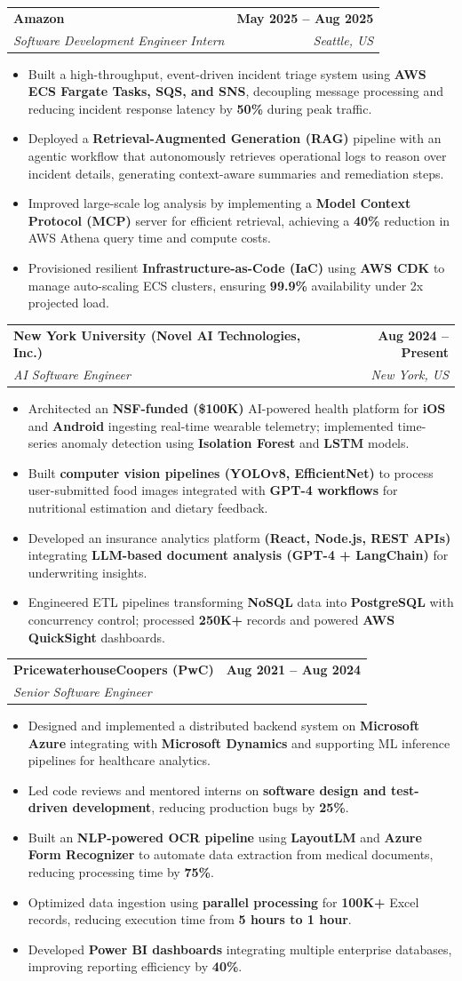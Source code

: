 \documentclass[letterpaper,10pt]{article}
\makeatletter
\newcommand{\resumeItem}[1]{
\item\small{{#1}\vspace{-3.5pt}}
}
\newcommand{\resumeSubheading}[4]{
\vspace{6pt}
\item
\begin{tabular*}{1.0\textwidth}[t]{l@{\extracolsep{\fill}}r}
\textbf{#1} & \textbf{\small #2} \\
\textit{\small#3} & \textit{\small #4} \\
\end{tabular*}\vspace{-5.5pt}
}
\newcommand{\resumeItemListStart}{\begin{itemize}[leftmargin=*, itemsep=0pt, topsep=0pt]}
\newcommand{\resumeItemListEnd}{\end{itemize}\vspace{-3pt}}
\makeatother
\begin{document}
\resumeSubheading
  {Amazon}{May 2025 -- Aug 2025}
  {Software Development Engineer Intern}{Seattle, US}
\resumeItemListStart
  \resumeItem{Built a high-throughput, event-driven incident triage system using \textbf{AWS ECS Fargate Tasks, SQS, and SNS}, decoupling message processing and reducing incident response latency by \textbf{50\%} during peak traffic.}
  \resumeItem{Deployed a \textbf{Retrieval-Augmented Generation (RAG)} pipeline with an agentic workflow that autonomously retrieves operational logs to reason over incident details, generating context-aware summaries and remediation steps.}
  \resumeItem{Improved large-scale log analysis by implementing a \textbf{Model Context Protocol (MCP)} server for efficient retrieval, achieving a \textbf{40\%} reduction in AWS Athena query time and compute costs.}
  \resumeItem{Provisioned resilient \textbf{Infrastructure-as-Code (IaC)} using \textbf{AWS CDK} to manage auto-scaling ECS clusters, ensuring \textbf{99.9\%} availability under 2x projected load.}
\resumeItemListEnd

\resumeSubheading
  {New York University (Novel AI Technologies, Inc.)}{Aug 2024 -- Present}
  {AI Software Engineer}{New York, US}
\resumeItemListStart
  \resumeItem{Architected an \textbf{NSF-funded (\$100K)} AI-powered health platform for \textbf{iOS} and \textbf{Android} ingesting real-time wearable telemetry; implemented time-series anomaly detection using \textbf{Isolation Forest} and \textbf{LSTM} models.}
  \resumeItem{Built \textbf{computer vision pipelines (YOLOv8, EfficientNet)} to process user-submitted food images integrated with \textbf{GPT-4 workflows} for nutritional estimation and dietary feedback.}
  \resumeItem{Developed an insurance analytics platform \textbf{(React, Node.js, REST APIs)} integrating \textbf{LLM-based document analysis (GPT-4 + LangChain)} for underwriting insights.}
  \resumeItem{Engineered ETL pipelines transforming \textbf{NoSQL} data into \textbf{PostgreSQL} with concurrency control; processed \textbf{250K+} records and powered \textbf{AWS QuickSight} dashboards.}
\resumeItemListEnd

\resumeSubheading
  {PricewaterhouseCoopers (PwC)}{Aug 2021 -- Aug 2024}
  {Senior Software Engineer}{}
\resumeItemListStart
  \resumeItem{Designed and implemented a distributed backend system on \textbf{Microsoft Azure} integrating with \textbf{Microsoft Dynamics} and supporting ML inference pipelines for healthcare analytics.}
  \resumeItem{Led code reviews and mentored interns on \textbf{software design and test-driven development}, reducing production bugs by \textbf{25\%}.}
  \resumeItem{Built an \textbf{NLP-powered OCR pipeline} using \textbf{LayoutLM} and \textbf{Azure Form Recognizer} to automate data extraction from medical documents, reducing processing time by \textbf{75\%}.}
  \resumeItem{Optimized data ingestion using \textbf{parallel processing} for \textbf{100K+} Excel records, reducing execution time from \textbf{5 hours to 1 hour}.}
  \resumeItem{Developed \textbf{Power BI dashboards} integrating multiple enterprise databases, improving reporting efficiency by \textbf{40\%}.}
\resumeItemListEnd
\end{document}
